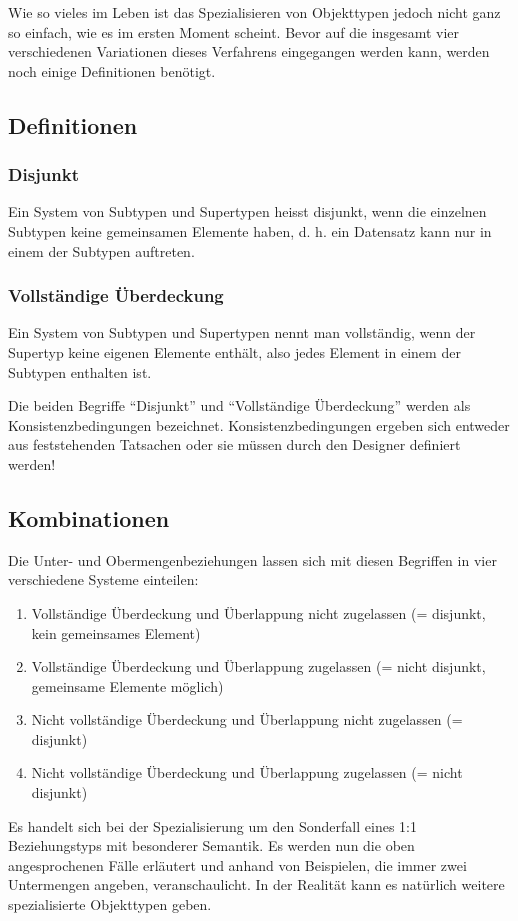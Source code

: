       Wie so vieles im Leben ist das Spezialisieren von Objekttypen jedoch
      nicht ganz so einfach, wie es im ersten Moment scheint. Bevor auf die
      insgesamt vier verschiedenen Variationen dieses Verfahrens eingegangen
      werden kann, werden noch einige Definitionen ben\"otigt.
      \subsection{Definitionen}
        \subsubsection{Disjunkt}
          Ein System von Subtypen und Supertypen heisst disjunkt, wenn die
          einzelnen Subtypen keine gemeinsamen Elemente haben, d. h. ein
          Datensatz kann nur in einem der Subtypen auftreten.
        \subsubsection{Vollst\"andige \"Uberdeckung}
          Ein System von Subtypen und Supertypen nennt man vollst\"andig, wenn
          der Supertyp keine eigenen Elemente enth\"alt, also jedes Element in
          einem der Subtypen enthalten ist.

          \begin{merke}
            Die beiden Begriffe \enquote{Disjunkt} und \enquote{Vollst\"andige
            \"Uberdeckung} werden als Konsistenzbedingungen bezeichnet.
            Konsistenzbedingungen ergeben sich entweder aus feststehenden
            Tatsachen oder sie m\"ussen durch den Designer definiert werden!
          \end{merke}

      \subsection{Kombinationen}
        Die Unter- und Obermengenbeziehungen lassen sich mit diesen Begriffen in
        vier verschiedene Systeme einteilen:
        \begin{enumerate}
          \item Vollst\"andige \"Uberdeckung und \"Uberlappung nicht zugelassen (= disjunkt, kein gemeinsames Element)
          \item Vollst\"andige \"Uberdeckung und \"Uberlappung zugelassen (= nicht disjunkt, gemeinsame Elemente m\"oglich)
          \item Nicht vollst\"andige \"Uberdeckung und \"Uberlappung nicht zugelassen (= disjunkt)
          \item Nicht vollst\"andige \"Uberdeckung und \"Uberlappung zugelassen (= nicht disjunkt)
        \end{enumerate}
        Es handelt sich bei der Spezialisierung um den Sonderfall eines 1:1
        Beziehungstyps mit besonderer Semantik. Es werden nun die oben
        angesprochenen F\"alle erl\"autert und anhand von Beispielen, die immer
        zwei Untermengen angeben, veranschaulicht. In der Realit\"at kann es
        nat\"urlich weitere spezialisierte Objekttypen geben.
